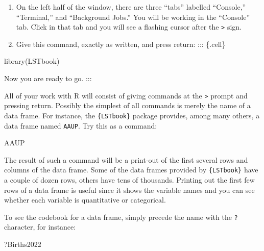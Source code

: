 \documentclass[
  letterpaper,
  DIV=11,
  numbers=noendperiod,
  oneside]{scrartcl}
\newenvironment{Shaded}{\begin{snugshade}}{\end{snugshade}}
\newcommand{\FunctionTok}[1]{\textcolor[rgb]{0.28,0.35,0.67}{#1}}
\newcommand{\NormalTok}[1]{\textcolor[rgb]{0.00,0.23,0.31}{#1}}
\begin{document}
\begin{tcolorbox}
\begin{enumerate}
\def\labelenumi{\arabic{enumi}.}
\setcounter{enumi}{1}
\item
  On the left half of the window, there are three ``tabs'' labelled
  ``Console,'' ``Terminal,'' and ``Background Jobs.'' You will be
  working in the ``Console'' tab. Click in that tab and you will see a
  flashing \texttt{\textbar{}} cursor after the \texttt{\textgreater{}}
  sign.
\item
  Give this command, exactly as written, and press return: ::: \{.cell\}
\end{enumerate}

\begin{Shaded}
\begin{Highlighting}[]
\FunctionTok{library}\NormalTok{(LSTbook)}
\end{Highlighting}
\end{Shaded}

\end{tcolorbox}

Now you are ready to go. :::

All of your work with R will consist of giving commands at the
\texttt{\textgreater{}} prompt and pressing return. Possibly the
simplest of all commands is merely the name of a data frame. For
instance, the \texttt{\{LSTbook\}} package provides, among many others,
a data frame named \texttt{AAUP}. Try this as a command:

\begin{Shaded}
\begin{Highlighting}[]
\NormalTok{AAUP}
\end{Highlighting}
\end{Shaded}

The result of such a command will be a print-out of the first several
rows and columns of the data frame. Some of the data frames provided by
\texttt{\{LSTbook\}} have a couple of dozen rows, others have tens of
thousands. Printing out the first few rows of a data frame is useful
since it shows the variable names and you can see whether each variable
is quantitative or categorical.

To see the codebook for a data frame, simply precede the name with the
\texttt{?} character, for instance:

\begin{Shaded}
\begin{Highlighting}[]
\NormalTok{?Births2022}
\end{Highlighting}
\end{Shaded}
\end{document}
